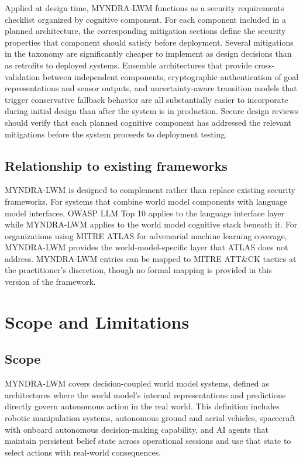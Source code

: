 \documentclass[11pt,a4paper]{article}
\begin{document}
Applied at design time, MYNDRA-LWM functions as a security requirements checklist organized by cognitive component. For each component included in a planned architecture, the corresponding mitigation sections define the security properties that component should satisfy before deployment. Several mitigations in the taxonomy are significantly cheaper to implement as design decisions than as retrofits to deployed systems. Ensemble architectures that provide cross-validation between independent components, cryptographic authentication of goal representations and sensor outputs, and uncertainty-aware transition models that trigger conservative fallback behavior are all substantially easier to incorporate during initial design than after the system is in production. Secure design reviews should verify that each planned cognitive component has addressed the relevant mitigations before the system proceeds to deployment testing.

\subsection{Relationship to existing frameworks}

MYNDRA-LWM is designed to complement rather than replace existing security frameworks. For systems that combine world model components with language model interfaces, OWASP LLM Top 10 applies to the language interface layer while MYNDRA-LWM applies to the world model cognitive stack beneath it. For organizations using MITRE ATLAS for adversarial machine learning coverage, MYNDRA-LWM provides the world-model-specific layer that ATLAS does not address. MYNDRA-LWM entries can be mapped to MITRE ATT\&CK tactics at the practitioner's discretion, though no formal mapping is provided in this version of the framework.

\section{Scope and Limitations}

\subsection{Scope}

MYNDRA-LWM covers decision-coupled world model systems, defined as architectures where the world model's internal representations and predictions directly govern autonomous action in the real world. This definition includes robotic manipulation systems, autonomous ground and aerial vehicles, spacecraft with onboard autonomous decision-making capability, and AI agents that maintain persistent belief state across operational sessions and use that state to select actions with real-world consequences.
\end{document}
